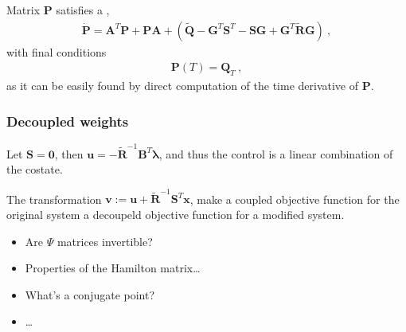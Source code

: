 \documentclass[letterpaper,10pt,english]{jupyterBook}
\begin{document}
\sphinxAtStartPar
Matrix \(\mathbf{P}\) satisfies a {\hyperref[\detokenize{ch/system-theory/lyapunov-equation:lyapunov-eq}]{}},
\begin{equation*}
\begin{split}\dot{\mathbf{P}} = \mathbf{A}^T \mathbf{P} + \mathbf{P}\mathbf{A} + \left( \widetilde{\mathbf{Q}} - \mathbf{G}^T \mathbf{S}^T - \mathbf{S} \mathbf{G} + \mathbf{G}^T \widetilde{\mathbf{R}} \mathbf{G} \right) \ ,\end{split}
\end{equation*}
\sphinxAtStartPar
with final conditions
\begin{equation*}
\begin{split}\mathbf{P}(T) = \mathbf{Q}_T \ ,\end{split}
\end{equation*}
\sphinxAtStartPar
as it can be easily found by direct computation of the time derivative of \(\mathbf{P}\).
\subsubsection*{Decoupled weights}

\sphinxAtStartPar
Let \(\mathbf{S} = \mathbf{0}\), then \(\mathbf{u} = - \widetilde{\mathbf{R}}^{-1} \mathbf{B}^T \boldsymbol\lambda\), and thus the control is a linear combination of the co\sphinxhyphen{}state.

\sphinxAtStartPar
The transformation \(\mathbf{v} := \mathbf{u} + \widetilde{\mathbf{R}}^{-1} \mathbf{S}^T \mathbf{x}\), make a coupled objective function for the original system a decoupeld objective function for a modified system.

\sphinxAtStartPar
{}
\begin{itemize}
\item {} 
\sphinxAtStartPar
Are \(\Psi\) matrices invertible?

\item {} 
\sphinxAtStartPar
Properties of the Hamilton matrix…

\item {} 
\sphinxAtStartPar
What’s a conjugate point?

\item {} 
\sphinxAtStartPar
…

\end{itemize}
\end{document}
